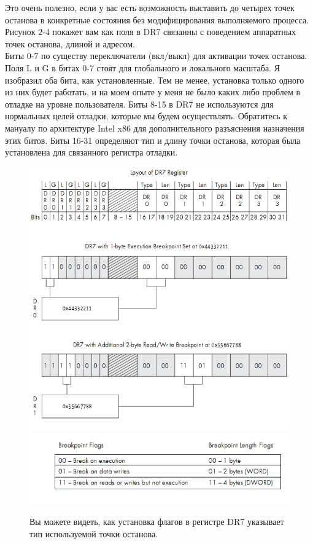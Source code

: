 \documentclass[12pt, a4paper, oneside]{book}
\begin{document}
Это очень полезно, если у вас есть возможность выставить до четырех точек останова в конкретные состояния без модифицирования выполняемого процесса. Рисунок 2-4 покажет вам как поля в DR7 связанны с поведением аппаратных точек останова, длиной и адресом.\\

Биты 0-7 по существу переключатели (вкл/выкл) для активации точек останова. Поля L и G в битах 0-7 стоят для глобального и локального масштаба. Я изобразил оба бита, как установленные. Тем не менее, установка только одного из них будет работать, и на моем опыте у меня не было каких либо проблем в отладке на уровне пользователя. Биты 8-15 в DR7 не используются для нормальных целей отладки, которые мы будем осуществлять. Обратитесь к мануалу по архитектуре Intel x86 для дополнительного разъяснения назначения этих битов. Биты 16-31 определяют тип и длину точки останова, которая была установлена для связанного регистра отладки.\\

\begin{figure}
  \center
  \includegraphics{./pic/chap2/4.PNG}
  \includegraphics{./pic/chap2/5.PNG}
  \caption{Вы можете видеть, как установка флагов в регистре DR7 указывает тип используемой точки останова.}
\end{figure}
\end{document}
